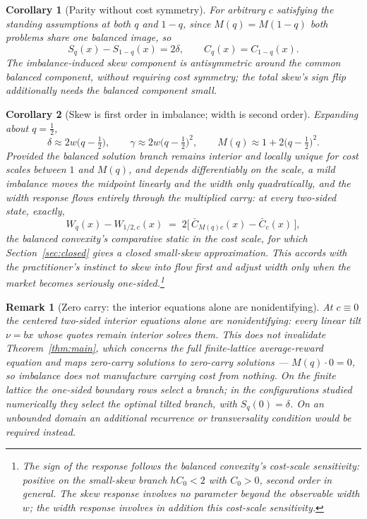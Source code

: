 \documentclass[11pt]{article}
\newtheorem{corollary}{Corollary}
\newtheorem{remark}{Remark}
\begin{document}
\begin{corollary}[Parity without cost symmetry]\label{cor:parity}
For arbitrary $c$ satisfying the standing assumptions at both $q$ and $1-q$, since $M(q) = M(1-q)$ both problems share one balanced image, so
\[
S_q(x) - S_{1-q}(x) = 2\delta, \qquad C_q(x) = C_{1-q}(x) .
\]
The imbalance-induced skew component is antisymmetric around the common balanced component, without requiring cost symmetry; the \emph{total} skew's sign flip additionally needs the balanced component small.
\end{corollary}

\begin{corollary}[Skew is first order in imbalance; width is second order]\label{cor:orders}
Expanding about $q = \tfrac12$,
\[
\delta \approx 2w\Big(q-\tfrac12\Big), \qquad
\gamma \approx 2w\Big(q-\tfrac12\Big)^{2}, \qquad
M(q) \approx 1 + 2\Big(q-\tfrac12\Big)^{2}.
\]
Provided the balanced solution branch remains interior and locally unique for cost scales between $1$ and $M(q)$, and depends differentiably on the scale, a mild imbalance moves the midpoint linearly and the width only quadratically, and the width response flows entirely through the multiplied carry: at every two-sided state, exactly,
\[
W_q(x) - W_{1/2,c}(x) \;=\; 2\big[\,\bar C_{M(q)c}(x) - \bar C_{c}(x)\,\big],
\]
the balanced convexity's comparative static in the cost scale, for which Section~\ref{sec:closed} gives a closed small-skew approximation. This accords with the practitioner's instinct to skew into flow first and adjust width only when the market becomes seriously one-sided.\footnote{The sign of the response follows the balanced convexity's cost-scale sensitivity: positive on the small-skew branch $hC_0 < 2$ with $C_0 > 0$, second order in general. The skew response involves no parameter beyond the observable width $w$; the width response involves in addition this cost-scale sensitivity.}
\end{corollary}

\begin{remark}[Zero carry: the interior equations alone are nonidentifying]\label{rem:zerocarry}
At $c \equiv 0$ the centered two-sided interior equations alone are nonidentifying: every linear tilt $\nu = bx$ whose quotes remain interior solves them. This does not invalidate Theorem~\ref{thm:main}, which concerns the full finite-lattice average-reward equation and maps zero-carry solutions to zero-carry solutions --- $M(q) \cdot 0 = 0$, so imbalance does not manufacture carrying cost from nothing. On the finite lattice the one-sided boundary rows select a branch; in the configurations studied numerically they select the optimal tilted branch, with $S_q(0) = \delta$. On an unbounded domain an additional recurrence or transversality condition would be required instead.
\end{remark}
\end{document}
